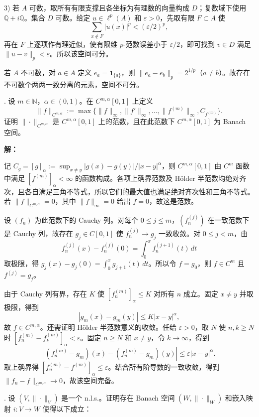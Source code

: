 \documentclass{article}
\begin{document}
3) 若 $A$ 可数，取所有有限支撑且各坐标为有理数的向量构成 $D$；复数域下使用 $\mathbb Q+i\mathbb Q$。集合 $D$ 可数。给定 $u\in\ell^p(A)$ 和 $\varepsilon>0$，先取有限 $F\subset A$ 使
\[
\sum_{x\notin F}|u(x)|^p<(\varepsilon/2)^p,
\]
再在 $F$ 上逐项作有理近似，使有限维 $p$-范数误差小于 $\varepsilon/2$，即可找到 $v\in D$ 满足 $\|u-v\|_p<\varepsilon$。所以该空间可分。

若 $A$ 不可数，对 $a\in A$ 定义 $e_a=\mathbf1_{\{a\}}$，则 $\|e_a-e_b\|_p=2^{1/p}$（$a\ne b$）。故存在不可数个两两一致分离的元素，空间不可分。


\par\medskip{}. 设 $m\in\mathbb N$，$\alpha\in(0,1)$。在 $C^{m,\alpha}[0,1]$ 上定义
\[
\|f\|_{C^{m,\alpha}}:=\max\{\|f\|_\infty,\|f'\|_\infty,\ldots,\|f^{(m)}\|_\infty,C_{f^{(m)}}\}.
\]
证明 $\|\cdot\|_{C^{m,\alpha}}$ 是 $C^{m,\alpha}[0,1]$ 上的范数，且在此范数下 $C^{m,\alpha}[0,1]$ 为 Banach 空间。


\par{}\noindent\textbf{解：}\par\nopagebreak[4]



记 $C_g=[g]_\alpha:=\sup_{x\ne y}|g(x)-g(y)|/|x-y|^\alpha$，则 $C^{m,\alpha}[0,1]$ 由 $C^m$ 函数中满足 $[f^{(m)}]_\alpha<\infty$ 的函数构成。各项上确界范数及 Hölder 半范数均绝对齐次，且各自满足三角不等式，所以它们的最大值也满足绝对齐次性和三角不等式。若 $\|f\|_{C^{m,\alpha}}=0$，其中 $\|f\|_\infty=0$ 给出 $f=0$，故这是范数。

设 $(f_n)$ 为此范数下的 Cauchy 列。对每个 $0\le j\le m$，$(f_n^{(j)})$ 在一致范数下是 Cauchy 列，故存在 $g_j\in C[0,1]$ 使 $f_n^{(j)}\to g_j$ 一致收敛。对 $0\le j<m$，由
\[
f_n^{(j)}(x)-f_n^{(j)}(0)=\int_0^x f_n^{(j+1)}(t)\,dt
\]
取极限，得 $g_j(x)-g_j(0)=\int_0^x g_{j+1}(t)\,dt$。所以令 $f=g_0$，则 $f\in C^m$ 且 $f^{(j)}=g_j$。

由于 Cauchy 列有界，存在 $K$ 使 $[f_n^{(m)}]_\alpha\le K$ 对所有 $n$ 成立。固定 $x\ne y$ 并取极限，得到
\[
|g_m(x)-g_m(y)|\le K|x-y|^\alpha,
\]
故 $f\in C^{m,\alpha}$。还需证明 Hölder 半范数意义的收敛。任给 $\varepsilon>0$，取 $N$ 使 $n,k\ge N$ 时 $[f_n^{(m)}-f_k^{(m)}]_\alpha<\varepsilon$。固定 $n\ge N$ 和 $x\ne y$，令 $k\to\infty$，得到
\[
|(f_n^{(m)}-g_m)(x)-(f_n^{(m)}-g_m)(y)|\le\varepsilon|x-y|^\alpha.
\]
取上确界得 $[f_n^{(m)}-f^{(m)}]_\alpha\le\varepsilon$。结合所有阶导数的一致收敛，得到 $\|f_n-f\|_{C^{m,\alpha}}\to0$，故该空间完备。


\par\medskip{}. 设 $(V,\|\cdot\|_V)$ 是一个 n.l.s.。证明存在 Banach 空间 $(W,\|\cdot\|_W)$ 和嵌入映射 $i:V\to W$ 使得以下成立：
\end{document}
